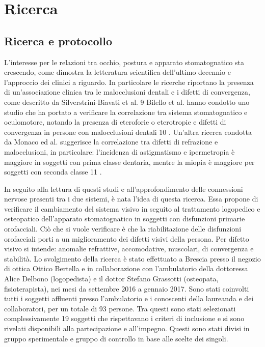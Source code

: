 \chapter{Ricerca}
\section{Ricerca e protocollo}

L’interesse per le relazioni tra occhio, postura e apparato stomatognatico sta crescendo, come dimostra la letteratura
scientifica dell’ultimo decennio e l’approccio dei clinici a riguardo. In particolare le ricerche riportano la presenza di
un’associazione clinica tra le malocclusioni dentali e i difetti di convergenza, come descritto da Silverstrini-Biavati et al. 9
Bilello et al. hanno condotto uno studio che ha portato a verificare la correlazione tra sistema stomatognatico e
oculomotore, notando la presenza di eteroforie o eterotropie e difetti di convergenza in persone con malocclusioni
dentali 10 . Un’altra ricerca condotta da Monaco ed al. suggerisce la correlazione tra difetti di refrazione e malocclusioni,
in particolare: l’incidenza di astigmatismo e ipermetropia è maggiore in soggetti con prima classe dentaria, mentre la
miopia è maggiore per soggetti con seconda classe 11 .

In seguito alla lettura di questi studi e all’approfondimento delle connessioni nervose presenti tra i due sistemi, è nata
l’idea di questa ricerca. Essa propone di verificare il cambiamento del sistema visivo in seguito al trattamento
logopedico e osteopatico dell’apparato stomatognatico in soggetti con disfunzioni primarie orofacciali. Ciò che si vuole
verificare è che la riabilitazione delle disfunzioni orofacciali porti a un miglioramento dei difetti visivi della persona. Per
difetto visivo si intende: anomalie refrattive, accomodative, muscolari, di convergenza e stabilità. Lo svolgimento della
ricerca è stato effettuato a Brescia presso il negozio di ottica Ottico Bertella e in collaborazione con l’ambulatorio della
dottoressa Alice Delbono (logopedista) e il dottor Stefano Grassotti (osteopata, fisioterapista), nei mesi da settembre
2016 a gennaio 2017. Sono stati coinvolti tutti i soggetti affluenti presso l’ambulatorio e i conoscenti della laureanda e
dei collaboratori, per un totale di 93 persone. Tra questi sono stati selezionati complessivamente 19 soggetti che
rispettavano i criteri di inclusione e si sono rivelati disponibili alla partecipazione e all’impegno. Questi sono stati divisi
in gruppo sperimentale e gruppo di controllo in base alle scelte dei singoli.

